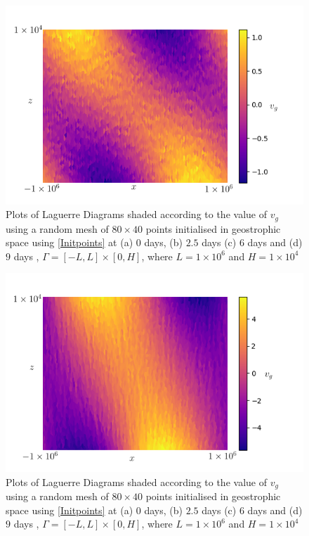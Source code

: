 \begin{figure}[ht]
	\centering
	\includegraphics[width=0.8\linewidth]{evaluation/laguerre_diagram_vg_0}
	\caption{Plots of Laguerre Diagrams shaded according to the value of $v_g$ using a random mesh of $80 \times 40$ points initialised in geostrophic space using \ref{Initpoints} at (a) $0$ days, (b) $2.5$ days (c) $6$ days and (d) $9$ days , $\Gamma = [-L,L]\times[0,H]$, where $L = 1\times10^6$ and $H = 1\times10^4$}
\end{figure}
\begin{figure}
	\centering
	\includegraphics[width=0.8\linewidth]{evaluation/laguerre_diagram_vg_5}
	\caption{Plots of Laguerre Diagrams shaded according to the value of $v_g$ using a random mesh of $80 \times 40$ points initialised in geostrophic space using \ref{Initpoints} at (a) $0$ days, (b) $2.5$ days (c) $6$ days and (d) $9$ days , $\Gamma = [-L,L]\times[0,H]$, where $L = 1\times10^6$ and $H = 1\times10^4$}
\end{figure}
